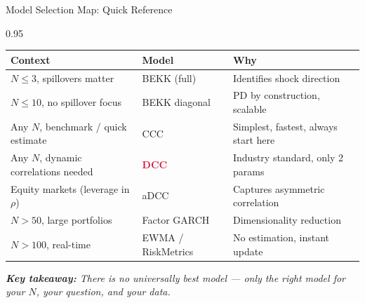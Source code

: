\documentclass[9pt, aspectratio=169, t]{beamer}
\begin{document}
\begin{frame}{Model Selection Map: Quick Reference}
    \begin{cminipage}{0.95\textwidth}
    {\footnotesize
    \renewcommand{\arraystretch}{1.4}
    \begin{tabular}{@{}p{5.5cm}p{3cm}p{4.5cm}@{}}
        \toprule
        \textbf{Context} & \textbf{Model} & \textbf{Why} \\
        \midrule
        $N \leq 3$, spillovers matter & BEKK (full) & Identifies shock direction \\
        $N \leq 10$, no spillover focus & BEKK diagonal & PD by construction, scalable \\
        Any $N$, benchmark / quick estimate & CCC & Simplest, fastest, always start here \\
        Any $N$, dynamic correlations needed & \textcolor{Crimson}{\textbf{DCC}} & Industry standard, only 2 params \\
        Equity markets (leverage in $\rho$) & aDCC & Captures asymmetric correlation \\
        $N > 50$, large portfolios & Factor GARCH & Dimensionality reduction \\
        $N > 100$, real-time & EWMA / RiskMetrics & No estimation, instant update \\
        \bottomrule
    \end{tabular}
    \vspace{3mm}

    \textit{\textbf{Key takeaway:} There is no universally best model --- only the right model for your $N$, your question, and your data.}
    }
    \end{cminipage}
\end{frame}

\end{document}
